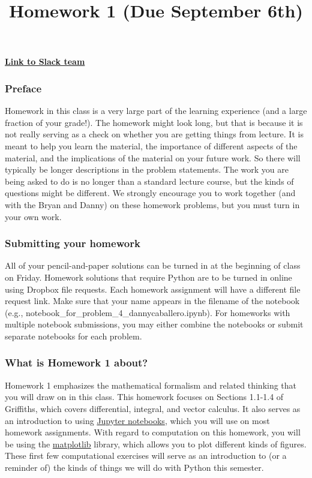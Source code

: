 \documentclass[
  letterpaperpaper,
]{article}
\title{Homework 1 (Due September 6th)}
\date{}
\begin{document}
\maketitle

\href{http://msuphysics481fall2019.slack.com}{\textbf{Link to Slack
team}}

\hypertarget{preface}{%
\subsubsection{Preface}\label{preface}}

Homework in this class is a very large part of the learning experience
(and a large fraction of your grade!). The homework might look long, but
that is because it is not really serving as a check on whether you are
getting things from lecture. It is meant to help you learn the material,
the importance of different aspects of the material, and the
implications of the material on your future work. So there will
typically be longer descriptions in the problem statements. The work you
are being asked to do is no longer than a standard lecture course, but
the kinds of questions might be different. We strongly encourage you to
work together (and with the Bryan and Danny) on these homework problems,
but you must turn in your own work.

\hypertarget{submitting-your-homework}{%
\subsubsection{Submitting your
homework}\label{submitting-your-homework}}

All of your pencil-and-paper solutions can be turned in at the beginning
of class on Friday. Homework solutions that require Python are to be
turned in online using Dropbox file requests. Each homework assignment
will have a different file request link. Make sure that your name
appears in the filename of the notebook (e.g.,
notebook\_for\_problem\_4\_dannycaballero.ipynb). For homeworks with
multiple notebook submissions, you may either combine the notebooks or
submit separate notebooks for each problem.

\hypertarget{what-is-homework-1-about}{%
\subsubsection{What is Homework 1
about?}\label{what-is-homework-1-about}}

Homework 1 emphasizes the mathematical formalism and related thinking
that you will draw on in this class. This homework focuses on Sections
1.1-1.4 of Griffiths, which covers differential, integral, and vector
calculus. It also serves as an introduction to using
\href{http://jupyter.org}{Jupyter notebooks}, which you will use on most
homework assignments. With regard to computation on this homework, you
will be using the \href{http://matplotlib.org/}{matplotlib} library,
which allows you to plot different kinds of figures. These first few
computational exercises will serve as an introduction to (or a reminder
of) the kinds of things we will do with Python this semester.
\end{document}
